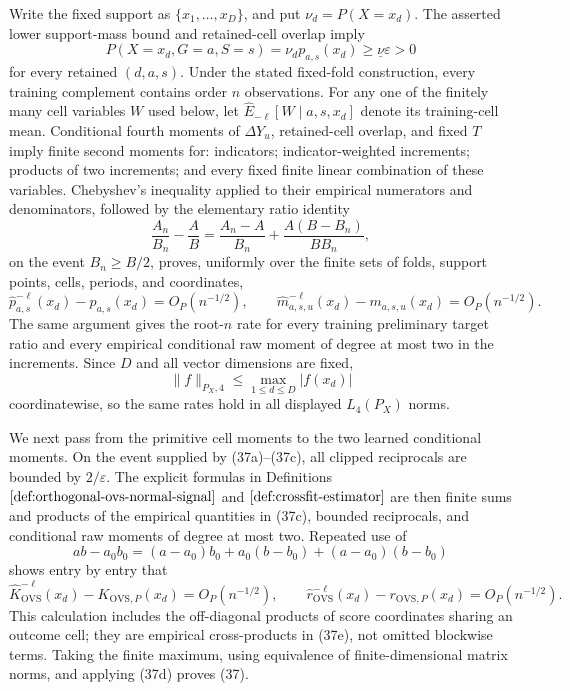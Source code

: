 Write the fixed support as \(\{x_1,\ldots,x_D\}\), and put \(\nu_d=P(X=x_d)\).  The asserted lower support-mass bound and retained-cell overlap imply
\[
P(X=x_d,G=a,S=s)=\nu_d p_{a,s}(x_d)\ge \underline\nu\varepsilon>0
\tag{37a}
\]
for every retained \((d,a,s)\).  Under the stated fixed-fold construction, every training complement contains order \(n\) observations.  For any one of the finitely many cell variables \(W\) used below, let \(\widehat E_{-\ell}[W\mid a,s,x_d]\) denote its training-cell mean.  Conditional fourth moments of \(\Delta Y_u\), retained-cell overlap, and fixed \(T\) imply finite second moments for: indicators; indicator-weighted increments; products of two increments; and every fixed finite linear combination of these variables.  Chebyshev's inequality applied to their empirical numerators and denominators, followed by the elementary ratio identity
\[
\frac{A_n}{B_n}-\frac{A}{B}
=\frac{A_n-A}{B_n}+\frac{A(B-B_n)}{BB_n},
\tag{37b}
\]
on the event \(B_n\ge B/2\), proves, uniformly over the finite sets of folds, support points, cells, periods, and coordinates,
\[
\widehat p_{a,s}^{-\ell}(x_d)-p_{a,s}(x_d)=O_P(n^{-1/2}),
\qquad
\widehat m_{a,s,u}^{-\ell}(x_d)-m_{a,s,u}(x_d)=O_P(n^{-1/2}).
\tag{37c}
\]
The same argument gives the root-\(n\) rate for every training preliminary target ratio and every empirical conditional raw moment of degree at most two in the increments.  Since \(D\) and all vector dimensions are fixed,
\[
\|f\|_{P_X,4}\le \max_{1\le d\le D}|f(x_d)|
\tag{37d}
\]
coordinatewise, so the same rates hold in all displayed \(L_4(P_X)\) norms.

We next pass from the primitive cell moments to the two learned conditional moments.  On the event supplied by (37a)--(37c), all clipped reciprocals are bounded by \(2/\varepsilon\).  The explicit formulas in Definitions \(\ref{def:orthogonal-ovs-normal-signal}\) and \(\ref{def:crossfit-estimator}\) are then finite sums and products of the empirical quantities in (37c), bounded reciprocals, and conditional raw moments of degree at most two.  Repeated use of
\[
ab-a_0b_0=(a-a_0)b_0+a_0(b-b_0)+(a-a_0)(b-b_0)
\tag{37e}
\]
shows entry by entry that
\[
\widehat K_{\mathrm{OVS}}^{-\ell}(x_d)-K_{\mathrm{OVS},P}(x_d)
=O_P(n^{-1/2}),
\qquad
\widehat r_{\mathrm{OVS}}^{-\ell}(x_d)-r_{\mathrm{OVS},P}(x_d)
=O_P(n^{-1/2}).
\tag{37f}
\]
This calculation includes the off-diagonal products of score coordinates sharing an outcome cell; they are empirical cross-products in (37e), not omitted blockwise terms.  Taking the finite maximum, using equivalence of finite-dimensional matrix norms, and applying (37d) proves (37).

